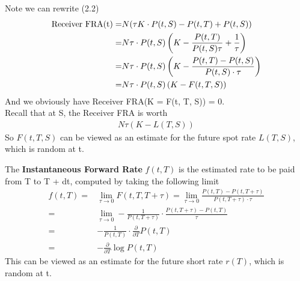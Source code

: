 Note we can rewrite (2.2)
\begin{align}
    \text{Receiver FRA(t)} 
    =& N (\tau K \cdot P(t, S) - P(t, T) + P(t, S)) \notag \\
    =& N \tau \cdot P(t, S) \left( K - \frac{P(t, T)}{P(t, S) \tau} + \frac{1}{\tau}\right) \notag \\  
    =& N \tau \cdot P(t, S) \left( K - \frac{P(t, T) - P(t, S)}{P(t, S) \cdot \tau}\right) \notag \\
    =& N \tau \cdot P(t, S) \left( K - F(t, T, S) \right)
\end{align}
And we obviously have Receiver FRA(K = F(t, T, S)) = 0. \\
Recall that at S, the Receiver FRA is worth 
\begin{align*}
    N \tau (K - L(T, S))  
\end{align*}
So $ F(t, T, S) $ can be viewed as an estimate for the future spot rate $L(T, S)$, which is random at t.

\begin{definition}
    The \textbf{Instantaneous Forward Rate} $f(t, T)$ is the estimated rate to be paid from T to T + dt, 
    computed by taking the following limit \\
    \begin{align*}
        f(t, T) =& \lim_{\tau \to 0} F(t, T, T + \tau) = \lim_{\tau \to 0} \frac{P(t, T) - P(t, T + \tau)}{P(t, T + \tau) \cdot \tau} \\
        =& \lim_{\tau \to 0} -\frac{1}{P(t, T + \tau)} \cdot \frac{P(t, T + \tau) - P(t, T)}{\tau}  \\
        =& -\frac{1}{P(t, T)} \cdot \frac{\partial}{\partial T} P(t, T) \\
        =& -\frac{\partial}{\partial T} \log P(t, T)
    \end{align*}
    This can be viewed as an estimate for the future short rate $r(T)$, which is random at t.
\end{definition}

